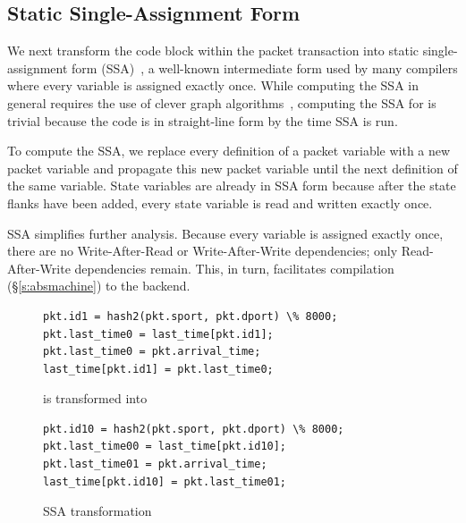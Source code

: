 
\subsection{Static Single-Assignment Form}
We next transform the code block within the packet transaction into static
single-assignment form (SSA)~\cite{ferrante_ssa}, a well-known intermediate
form used by many compilers where every variable is assigned exactly once.
While computing the SSA in general requires the use of clever graph
algorithms~\cite{post_dominators}, computing the SSA for \pktlanguage is
trivial because the code is in straight-line form by the time SSA is run.

To compute the SSA, we replace every definition of a packet variable with a new
packet variable and propagate this new packet variable until the next
definition of the same variable. State variables are already in SSA form
because after the state flanks have been added, every state variable is read
and written exactly once.

SSA simplifies further analysis. Because every variable is assigned exactly
once, there are no Write-After-Read or Write-After-Write dependencies; only
Read-After-Write dependencies remain. This, in turn, facilitates compilation
(\S\ref{s:absmachine}) to the backend.
\begin{figure}
\begin{tiny}
\begin{lstlisting}
pkt.id1 = hash2(pkt.sport, pkt.dport) \% 8000;
pkt.last_time0 = last_time[pkt.id1];
pkt.last_time0 = pkt.arrival_time;
last_time[pkt.id1] = pkt.last_time0;
\end{lstlisting}
\end{tiny}
\begin{center}
is transformed into
\end{center}
\begin{tiny}
\begin{lstlisting}
pkt.id10 = hash2(pkt.sport, pkt.dport) \% 8000;
pkt.last_time00 = last_time[pkt.id10];
pkt.last_time01 = pkt.arrival_time;
last_time[pkt.id10] = pkt.last_time01;
\end{lstlisting}
\end{tiny}
\caption{SSA transformation}
\label{fig:stateful_flanks}
\end{figure}

